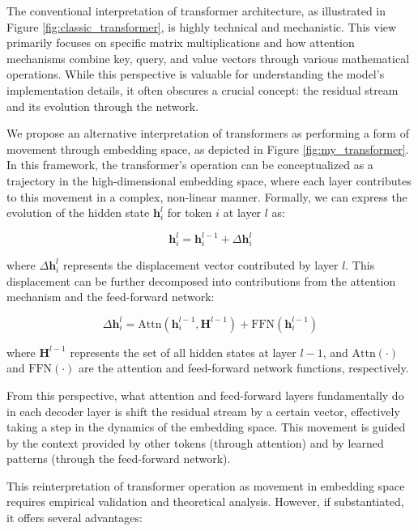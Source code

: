 The conventional interpretation of transformer architecture, as illustrated in Figure \ref{fig:classic_transformer}, is highly technical and mechanistic. This view primarily focuses on specific matrix multiplications and how attention mechanisms combine key, query, and value vectors through various mathematical operations. While this perspective is valuable for understanding the model's implementation details, it often obscures a crucial concept: the residual stream and its evolution through the network.

We propose an alternative interpretation of transformers as performing a form of movement through embedding space, as depicted in Figure \ref{fig:my_transformer}. In this framework, the transformer's operation can be conceptualized as a trajectory in the high-dimensional embedding space, where each layer contributes to this movement in a complex, non-linear manner. Formally, we can express the evolution of the hidden state $\mathbf{h}_i^l$ for token $i$ at layer $l$ as:

\begin{equation}
    \mathbf{h}_i^{l} = \mathbf{h}_i^{l-1} + \Delta\mathbf{h}_i^{l}
    \label{eq::residual_movement}
\end{equation}

where $\Delta\mathbf{h}_i^{l}$ represents the displacement vector contributed by layer $l$. This displacement can be further decomposed into contributions from the attention mechanism and the feed-forward network:

\begin{equation}
    \Delta\mathbf{h}_i^{l} = \text{Attn}(\mathbf{h}_i^{l-1}, \mathbf{H}^{l-1}) + \text{FFN}(\mathbf{h}_i^{l-1})
    \label{eq::displacement}
\end{equation}

where $\mathbf{H}^{l-1}$ represents the set of all hidden states at layer $l-1$, and $\text{Attn}(\cdot)$ and $\text{FFN}(\cdot)$ are the attention and feed-forward network functions, respectively.

From this perspective, what attention and feed-forward layers fundamentally do in each decoder layer is shift the residual stream by a certain vector, effectively taking a step in the dynamics of the embedding space. This movement is guided by the context provided by other tokens (through attention) and by learned patterns (through the feed-forward network).

This reinterpretation of transformer operation as movement in embedding space requires empirical validation and theoretical analysis. However, if substantiated, it offers several advantages:


